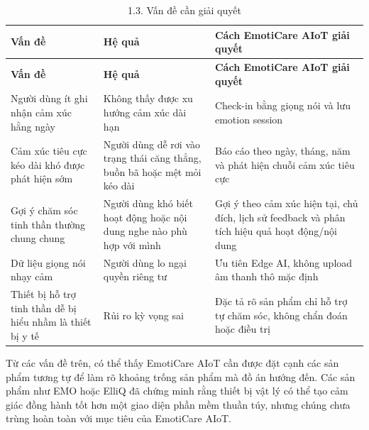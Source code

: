 \documentclass[12pt,a4paper]{article}
\begin{document}
\begin{center}
\begin{longtable}{|P{0.25\textwidth}|P{0.32\textwidth}|P{0.33\textwidth}|}
\caption{1.3. Vấn đề cần giải quyết}\\
\hline
\textbf{Vấn đề} & \textbf{Hệ quả} & \textbf{Cách EmotiCare AIoT giải quyết} \\
\hline
\endfirsthead
\hline
\textbf{Vấn đề} & \textbf{Hệ quả} & \textbf{Cách EmotiCare AIoT giải quyết} \\
\hline
\endhead
Người dùng ít ghi nhận cảm xúc hằng ngày & Không thấy được xu hướng cảm xúc dài hạn & Check-in bằng giọng nói và lưu emotion session \\
\hline
Cảm xúc tiêu cực kéo dài khó được phát hiện sớm & Người dùng dễ rơi vào trạng thái căng thẳng, buồn bã hoặc mệt mỏi kéo dài & Báo cáo theo ngày, tháng, năm và phát hiện chuỗi cảm xúc tiêu cực \\
\hline
Gợi ý chăm sóc tinh thần thường chung chung & Người dùng khó biết hoạt động hoặc nội dung nghe nào phù hợp với mình & Gợi ý theo cảm xúc hiện tại, chủ đích, lịch sử feedback và phân tích hiệu quả hoạt động/nội dung \\
\hline
Dữ liệu giọng nói nhạy cảm & Người dùng lo ngại quyền riêng tư & Ưu tiên Edge AI, không upload âm thanh thô mặc định \\
\hline
Thiết bị hỗ trợ tinh thần dễ bị hiểu nhầm là thiết bị y tế & Rủi ro kỳ vọng sai & Đặc tả rõ sản phẩm chỉ hỗ trợ tự chăm sóc, không chẩn đoán hoặc điều trị \\
\hline
\end{longtable}
\end{center}

Từ các vấn đề trên, có thể thấy EmotiCare AIoT cần được đặt cạnh các sản phẩm tương tự để làm rõ khoảng trống sản phẩm mà đồ án hướng đến. Các sản phẩm như EMO hoặc ElliQ đã chứng minh rằng thiết bị vật lý có thể tạo cảm giác đồng hành tốt hơn một giao diện phần mềm thuần túy, nhưng chúng chưa trùng hoàn toàn với mục tiêu của EmotiCare AIoT.
\end{document}
